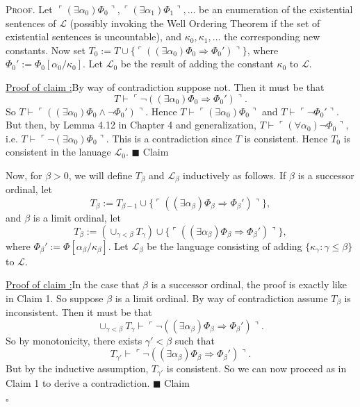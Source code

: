 \documentclass[12pt]{article}
\newcounter{ProofCounter}
\newcounter{ClaimCounter}[ProofCounter]
\newenvironment{Proof}{\stepcounter{ProofCounter}\textsc{Proof.}}{\hfill$\square$}
\newenvironment{claim}[1]{\vspace{1mm}\stepcounter{ClaimCounter}\par\noindent\underline{\bf Claim \theClaimCounter:}\space#1}{}
\newenvironment{claimproof}[1]{\par\noindent\underline{Proof of claim \theClaimCounter:}\space#1}{\hfill $\blacksquare$ Claim \theClaimCounter}
\begin{document}
\begin{Proof}
  Let $\ulcorner (\exists \alpha_0) \Phi_0 \urcorner, \ulcorner (\exists \alpha_1)
  \Phi_1 \urcorner, \dots$ be an enumeration of the existential sentences of $\mathcal{L}$ (possibly invoking the Well Ordering Theorem if the set
  of existential sentences is uncountable), and $\kappa_0, \kappa_1, \dots$ the corresponding new constants. 
  Now set $T_0 := T \cup \{ \ulcorner((\exists \alpha_0) \Phi_0 \Rightarrow \Phi_0')\urcorner \}$, where $\Phi_0' := \Phi_0[\alpha_0 / \kappa_{0}]$.
  Let $\mathcal{L}_0$ be the result of adding the constant $\kappa_0$ to $\mathcal{L}$.
  \begin{claimproof}
    By way of contradiction suppose not. Then it must be that 
    \[ T \vdash \ulcorner \neg ((\exists \alpha_0) \Phi_0 \Rightarrow \Phi_0') \urcorner. \]
    So $T \vdash \ulcorner ((\exists \alpha_0) \Phi_0 \wedge \neg \Phi_0') \urcorner$. Hence $T \vdash \ulcorner (\exists \alpha_0) \Phi_0 \urcorner$ and 
    $T \vdash \ulcorner \neg \Phi_0'\urcorner$. But then, by Lemma 4.12 in Chapter 4 and generalization, $T \vdash \ulcorner (\forall \alpha_0) \neg
    \Phi_0 \urcorner$, i.e. $T \vdash \ulcorner \neg (\exists \alpha_0) \Phi_0 \urcorner$. This is a contradiction since $T$ is consistent. Hence $T_0$ is consistent in the
    lanuage $\mathcal{L}_0$.
  \end{claimproof}

  Now, for $\beta > 0$, we will define $T_{\beta}$ and $\mathcal{L}_\beta$ inductively as follows. If $\beta$ is a successor ordinal, let 
  \[ T_\beta := T_{\beta - 1} \cup \{ \ulcorner((\exists \alpha_\beta) \Phi_\beta \Rightarrow \Phi_\beta')\urcorner \}, \]
  and $\beta$ is a limit ordinal, let 
  \[ T_\beta := (\cup_{\gamma < \beta} T_{\gamma} )\cup \{ \ulcorner((\exists \alpha_\beta) \Phi_\beta \Rightarrow \Phi_\beta')\urcorner \}, \]
  where $\Phi_\beta' := \Phi[\alpha_\beta / \kappa_{\beta}]$. Let $\mathcal{L}_\beta$ be the language consisting of adding $\{ \kappa_{\gamma} : \gamma \leq
  \beta \}$ to $\mathcal{L}$.

  \begin{claimproof}
    In the case that $\beta$ is a successor ordinal, the proof is exactly like in Claim 1. So suppose $\beta$ is a limit
    ordinal. By way of contradiction assume $T_\beta$ is inconsistent. Then it must be that 
    \[ \cup_{\gamma < \beta}T_\gamma \vdash \ulcorner \neg ((\exists \alpha_\beta) \Phi_\beta \Rightarrow \Phi_\beta') \urcorner. \]
    So by monotonicity, there exists $\gamma' < \beta$ such that 
    \[ T_{\gamma'} \vdash \ulcorner \neg ((\exists \alpha_\beta) \Phi_\beta \Rightarrow \Phi_\beta') \urcorner. \]
    But by the inductive assumption, $T_{\gamma'}$ is consistent. So we can now proceed as in Claim 1 to derive a contradiction.
  \end{claimproof}


\end{Proof}
\end{document}
